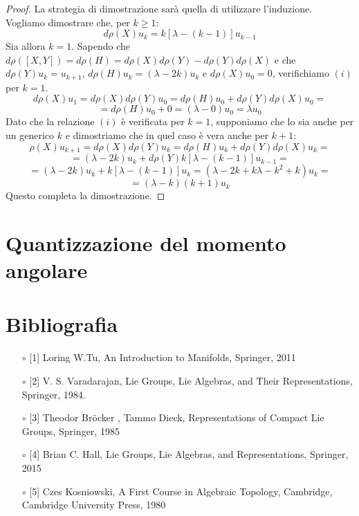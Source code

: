 \documentclass[12pt,a4paper]{report}
\theoremstyle{definition}
\theoremstyle{definition}
\theoremstyle{definition}
\theoremstyle{remark}
\begin{document}
\begin{proof}
	La strategia di dimostrazione sarà quella di utilizzare l'induzione.
	Vogliamo dimostrare che, per $k\geq 1$:
	\begin{equation}
		\label{eq:4}
		d\rho(X)u_k=k[\lambda-(k-1)]u_{k-1} 
\tag{i}
\end{equation}
	Sia allora $k=1$. Sapendo che $d\rho([X,Y])=d\rho(H)=d\rho(X)d\rho(Y)-d\rho(Y)d\rho(X)$ e che $d\rho(Y)u_k=u_{k+1}$, $d\rho(H)u_k=(\lambda-2k)u_k$ e $d\rho(X)u_0=0$, verifichiamo $(i)$ per $k=1$.
	$$d\rho(X)u_1=d\rho(X)d\rho(Y)u_0=d\rho(H)u_0+d\rho(Y)d\rho(X)u_0=$$$$=d\rho(H)u_0+0=(\lambda-0)u_0=\lambda u_0$$
	Dato che la relazione $(i)$ è verificata per $k=1$, supponiamo che lo sia anche per un generico $k$ e dimostriamo che in quel caso è vera anche per $k+1$:
	$$\rho(X)u_{k+1}=d\rho(X)d\rho(Y)u_{k}=d\rho(H)u_k+d\rho(Y)d\rho(X)u_k=$$
	$$=(\lambda-2k)u_k+d\rho(Y)k[\lambda-(k-1)]u_{k-1}=$$ 
	$$=(\lambda-2k)u_k+k[\lambda-(k-1)]u_{k}=(\lambda-2k+k\lambda-k^2+k)u_k=$$
	$$=(\lambda-k)(k+1)u_k$$
	Questo completa la dimostrazione.
\end{proof}
\chapter{Quantizzazione del momento angolare}
\chapter*{Bibliografia}
\begin{itemize}
	\item[$\circ$] [1] Loring W.Tu, An Introduction to Manifolds, Springer, 2011
	\item[$\circ$] [2] V. S. Varadarajan, Lie Groups, Lie Algebras, and Their Representations, Springer,
	1984.
	\item[$\circ$] [3] Theodor Bröcker , Tammo Dieck, Representations of Compact Lie Groups, Springer, 1985
	\item[$\circ$] [4] Brian C. Hall, Lie Groups, Lie Algebras, and Representations, Springer, 2015
	\item [$\circ$] [5] Czes Kosniowski, A First Course in Algebraic Topology, Cambridge, Cambridge University Press, 1980
\end{itemize}
\end{document}
